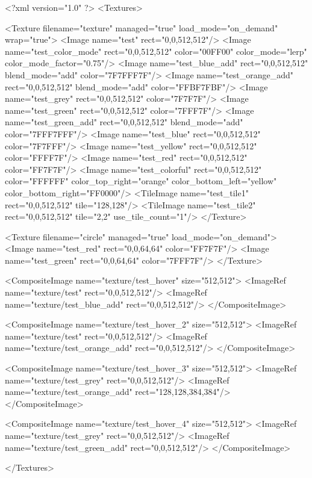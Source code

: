 <?xml version="1.0" ?>
<Textures>

	<Texture filename="texture" managed="true" load_mode="on_demand" wrap="true">
		<Image name="test" rect="0,0,512,512"/>
		<Image name="test_color_mode" rect="0,0,512,512" color="00FF00" color_mode="lerp" color_mode_factor="0.75"/>
		<Image name="test_blue_add" rect="0,0,512,512" blend_mode="add" color="7F7FFF7F"/>
		<Image name="test_orange_add" rect="0,0,512,512" blend_mode="add" color="FFBF7FBF"/>
		<Image name="test_grey" rect="0,0,512,512" color="7F7F7F"/>
		<Image name="test_green" rect="0,0,512,512" color="7FFF7F"/>
		<Image name="test_green_add" rect="0,0,512,512" blend_mode="add" color="7FFF7FFF"/>
		<Image name="test_blue" rect="0,0,512,512" color="7F7FFF"/>
		<Image name="test_yellow" rect="0,0,512,512" color="FFFF7F"/>
		<Image name="test_red" rect="0,0,512,512" color="FF7F7F"/>
		<Image name="test_colorful" rect="0,0,512,512" color="FFFFFF" color_top_right="orange" color_bottom_left="yellow" color_bottom_right="FF0000"/>
		<TileImage name="test_tile1" rect="0,0,512,512" tile="128,128"/>
		<TileImage name="test_tile2" rect="0,0,512,512" tile="2,2" use_tile_count="1"/>
	</Texture>
	
	<Texture filename="circle" managed="true" load_mode="on_demand">
		<Image name="test_red" rect="0,0,64,64" color="FF7F7F"/>
		<Image name="test_green" rect="0,0,64,64" color="7FFF7F"/>
	</Texture>
	
	<CompositeImage name="texture/test_hover" size="512,512">
		<ImageRef name="texture/test" rect="0,0,512,512"/>
		<ImageRef name="texture/test_blue_add" rect="0,0,512,512"/>
	</CompositeImage>
	
	<CompositeImage name="texture/test_hover_2" size="512,512">
		<ImageRef name="texture/test" rect="0,0,512,512"/>
		<ImageRef name="texture/test_orange_add" rect="0,0,512,512"/>
	</CompositeImage>
	
	<CompositeImage name="texture/test_hover_3" size="512,512">
		<ImageRef name="texture/test_grey" rect="0,0,512,512"/>
		<ImageRef name="texture/test_orange_add" rect="128,128,384,384"/>
	</CompositeImage>
	
	<CompositeImage name="texture/test_hover_4" size="512,512">
		<ImageRef name="texture/test_grey" rect="0,0,512,512"/>
		<ImageRef name="texture/test_green_add" rect="0,0,512,512"/>
	</CompositeImage>
	
</Textures>
